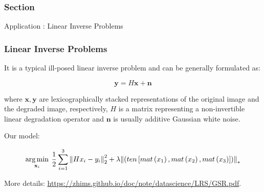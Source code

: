 \documentclass[aspectratio=2516]{beamer}
\begin{document}
\begin{frame}
\frametitle{ Section \uppercase\expandafter{}}


\begin{center}
	\Large Application \uppercase\expandafter{}: Linear Inverse Problems
\end{center}

\end{frame}
\begin{frame}
\frametitle{Linear Inverse Problems \uppercase\expandafter{}}

It is a typical ill-posed linear inverse problem and can be generally formulated as:

\begin{equation}
\boldsymbol{y} = H \boldsymbol{x} + \boldsymbol{n}
\label{eq1.1}
\end{equation}

where $ \boldsymbol{x}, \boldsymbol{y} $ are lexicographically stacked representations  of the original image and the degraded image, respectively, $ H $ is a matrix representing a non-invertible linear degradation operator and $ \boldsymbol{n} $ is usually additive Gaussian white noise. 


Our model:

\vspace{-0.15cm}

\begin{equation}
\mathop {\arg \min }\limits_{{{\bf{x}}_i}} \:\frac{1}{2}\sum\limits_{i = 1}^3 {\left\| {H{x_i} - {y_i}} \right\|_2^2}  + \lambda {\left\| {\left( {ten\left[ {mat\left( {{x_1}} \right),mat\left( {{x_2}} \right),mat\left( {{x_3}} \right)} \right]} \right)} \right\|_*}
\end{equation}

{\tiny More details:} {\color{blue} \tiny \url{https://zhims.github.io/doc/note/datascience/LRS/GSR.pdf}}.
\end{frame}
\end{document}
